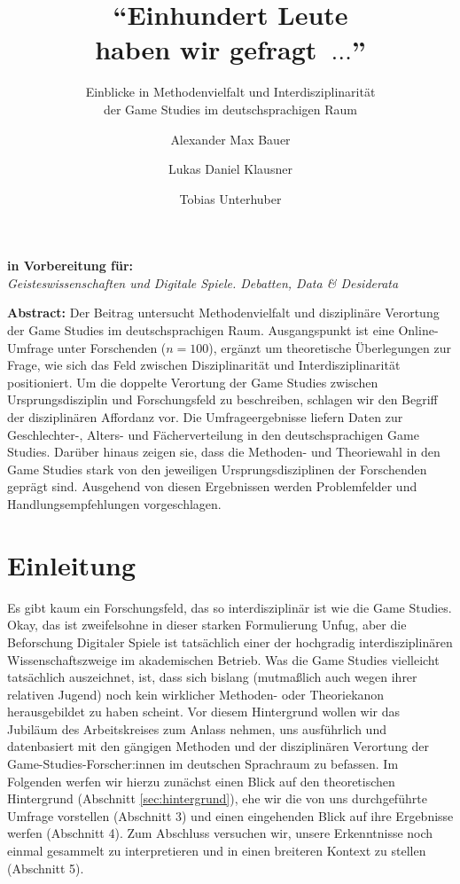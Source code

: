 \documentclass{scrartcl}
\title{\enquote{Einhundert Leute\\haben wir gefragt~$\ldots$}}
\subtitle{Einblicke in Methodenvielfalt und Interdisziplinarität\\der Game Studies im deutschsprachigen Raum}
\author[1]{Alexander Max Bauer}
\author[2]{Lukas Daniel Klausner}
\author[3]{Tobias Unterhuber}
\affil[1]{ Carl von Ossietzky Universität Oldenburg, Institut für Philosophie}
\affil[2]{ Fachhochschule St. Pölten, Institut für IT Sicherheitsforschung}
\affil[3]{ Universität Innsbruck, Institut für Germanistik}
\date{}
\begin{document}
\maketitle
\thispagestyle{empty}

\begin{center}
   \textbf{\textsf{in Vorbereitung für:}}\\
   \textit{Geisteswissenschaften und Digitale Spiele. Debatten, Data \& Desiderata}
\end{center}

\vfill
\noindent\textbf{\textsf{Abstract:}}
Der Beitrag untersucht Methodenvielfalt und disziplinäre Verortung der Game Studies im deutschsprachigen Raum.
Ausgangspunkt ist eine Online-Umfrage unter Forschenden ($n = 100$), ergänzt um theoretische Überlegungen zur Frage, wie sich das Feld zwischen Disziplinarität und Interdisziplinarität positioniert.
Um die doppelte Verortung der Game Studies zwischen Ursprungsdisziplin und Forschungsfeld zu beschreiben, schlagen wir den Begriff der disziplinären Affordanz vor.
Die Umfrageergebnisse liefern Daten zur Geschlechter-, Alters- und Fächerverteilung in den deutschsprachigen Game Studies.
Darüber hinaus zeigen sie, dass die Methoden- und Theoriewahl in den Game Studies stark von den jeweiligen Ursprungsdisziplinen der Forschenden geprägt sind.
Ausgehend von diesen Ergebnissen werden Problemfelder und Handlungsempfehlungen vorgeschlagen.


\newpage
\section{Einleitung}\label{sec:einleitung}
Es gibt kaum ein Forschungsfeld, das so interdisziplinär ist wie die Game Studies.
Okay, das ist zweifelsohne in dieser starken Formulierung Unfug, aber die Beforschung Digitaler Spiele ist tatsächlich einer der hochgradig interdisziplinären Wissenschaftszweige im akademischen Betrieb.
Was die Game Studies vielleicht tatsächlich auszeichnet, ist, dass sich bislang (mutmaßlich auch wegen ihrer relativen Jugend)\autocite[Vgl.][]{unterhuber_magic_2022} noch kein wirklicher Methoden- oder Theoriekanon herausgebildet zu haben scheint.
Vor diesem Hintergrund wollen wir das Jubiläum des Arbeitskreises zum Anlass nehmen, uns ausführlich und datenbasiert mit den gängigen Methoden und der disziplinären Verortung der Game-Studies-Forscher:innen im deutschen Sprachraum zu befassen.
Im Folgenden werfen wir hierzu zunächst einen Blick auf den theoretischen Hintergrund (Abschnitt \ref{sec:hintergrund}), ehe wir die von uns durchgeführte Umfrage vorstellen (Abschnitt 3) und einen eingehenden Blick auf ihre Ergebnisse werfen (Abschnitt 4).
Zum Abschluss versuchen wir, unsere Erkenntnisse noch einmal gesammelt zu interpretieren und in einen breiteren Kontext zu stellen (Abschnitt 5).
\end{document}
